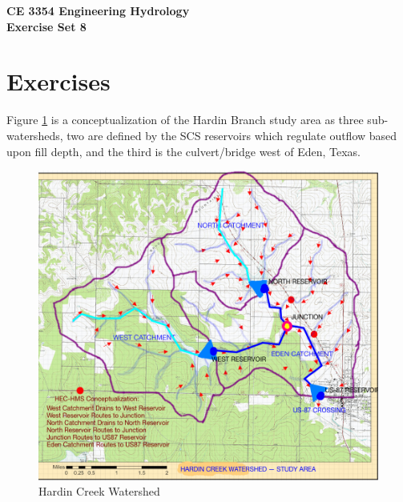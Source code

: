 \documentclass[12pt]{article}
\begin{document}
\begin{center}
{\textbf{{ CE 3354 Engineering Hydrology} \\ {Exercise Set 8}}}
\end{center}

\section*{\small{Exercises}} 

Figure \ref{fig:HEC-HMS-Conceptualization} is a conceptualization of the Hardin Branch study area as three sub-watersheds, two are defined by the SCS reservoirs which regulate outflow based upon fill depth, and the third is the culvert/bridge west of Eden, Texas.

\begin{figure}[h!] %
   \centering
   \includegraphics[width=6.0in]{HEC-HMS-Conceptualization.png} 
   \caption{Hardin Creek Watershed}
   \label{fig:HEC-HMS-Conceptualization}
\end{figure}
\clearpage
\end{document}
